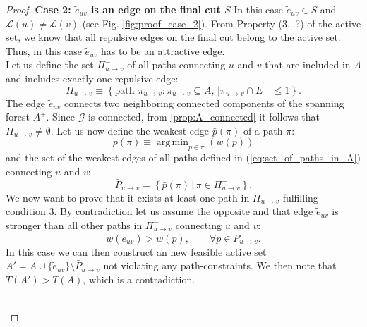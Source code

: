 \documentclass[12pt]{article}
\DeclareMathOperator*{\argmin}{arg\,min}
\newcommand\TODO[1]{\fbox{\textcolor{red}{TODO: #1}}}
\begin{document}
\begin{proof}
\noindent \textbf{Case 2: $\tilde{e}_{uv}$ is an edge on the final cut $S$}  
In this case $\tilde{e}_{uv} \in S $ and $\mathcal{L}(u)\neq\mathcal{L}(v)$ (see Fig. \ref{fig:proof_case_2}).
From Property (3...?) of the active set, we know that all repulsive edges on the final cut belong to the active set. Thus, in this case $\tilde{e}_{uv}$ has to be an attractive edge.\\ 
Let us define the set $\Pi_{u \rightarrow v}^-$ of all paths connecting $u$ and $v$ that are included in $A$ and includes exactly one repulsive edge: 
\begin{equation}\label{eq:set_of_paths_in_A}
\Pi_{u \rightarrow v}^- \equiv \left\{ \mathrm{path} \,\, \pi_{u \rightarrow v}  : \pi_{u \rightarrow v} \subseteq A, \, \left| \pi_{u \rightarrow v} \cap E^{-}  \right| \leq 1 \right \}.
\end{equation}  
The edge $\tilde{e}_{uv}$ connects two neighboring connected components of the spanning forest $A^+$. Since $\mathcal{G}$ is connected, from \autoref{prop:A_connected} it follows that $\Pi_{u \rightarrow v}^- \neq \emptyset$. Let us now define the weakest edge $\bar{p}(\pi)$ of a path $\pi$:
\begin{equation}
\bar{p}(\pi) \equiv \argmin_{p\in \pi}  (w(p))
\end{equation}
and the set of the weakest edges of all paths defined in (\ref{eq:set_of_paths_in_A}) connecting $u$ and $v$:
\begin{equation}
\bar{P}_{u \rightarrow v} = \left\{ \bar{p}(\pi) \, \big| \,\pi \in \Pi_{u \rightarrow v}^- \right\}.
\end{equation}
We now want to prove that it exists at least one path in $\Pi_{u \rightarrow v}^-$ fulfilling condition \hyperref[cond_3]{3}. By contradiction let us assume the opposite and that edge $\tilde{e}_{uv}$ is stronger than all other paths in $\Pi_{u \rightarrow v}^-$ connecting $u$ and $v$:
\begin{equation}
w(\tilde{e}_{uv}) > w(p), \quad \quad \forall p \in \bar{P}_{u \rightarrow v}.
\end{equation}
In this case we can then construct an new feasible active set $A'= A \cup \{\tilde{e}_{uv}\} \setminus \bar{P}_{u \rightarrow v}$ not violating any path-constraints. We then note that $T(A')>T(A)$, which is a contradiction.  

\TODO{Explain better this last part}\\

\end{proof}
\end{document}
